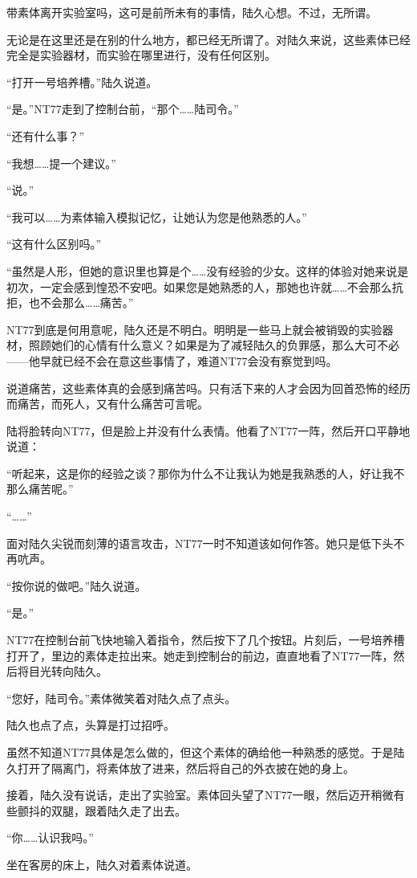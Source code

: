 带素体离开实验室吗，这可是前所未有的事情，陆久心想。不过，无所谓。

无论是在这里还是在别的什么地方，都已经无所谓了。对陆久来说，这些素体已经完全是实验器材，而实验在哪里进行，没有任何区别。

“打开一号培养槽。”陆久说道。

“是。”NT77走到了控制台前，“那个……陆司令。”

“还有什么事？”

“我想……提一个建议。”

“说。”

“我可以……为素体输入模拟记忆，让她认为您是他熟悉的人。”

“这有什么区别吗。”

“虽然是人形，但她的意识里也算是个……没有经验的少女。这样的体验对她来说是初次，一定会感到惶恐不安吧。如果您是她熟悉的人，那她也许就……不会那么抗拒，也不会那么……痛苦。”

NT77到底是何用意呢，陆久还是不明白。明明是一些马上就会被销毁的实验器材，照顾她们的心情有什么意义？如果是为了减轻陆久的负罪感，那么大可不必——他早就已经不会在意这些事情了，难道NT77会没有察觉到吗。

说道痛苦，这些素体真的会感到痛苦吗。只有活下来的人才会因为回首恐怖的经历而痛苦，而死人，又有什么痛苦可言呢。

陆将脸转向NT77，但是脸上并没有什么表情。他看了NT77一阵，然后开口平静地说道：

“听起来，这是你的经验之谈？那你为什么不让我认为她是我熟悉的人，好让我不那么痛苦呢。”

“……”

面对陆久尖锐而刻薄的语言攻击，NT77一时不知道该如何作答。她只是低下头不再吭声。

“按你说的做吧。”陆久说道。

“是。”

NT77在控制台前飞快地输入着指令，然后按下了几个按钮。片刻后，一号培养槽打开了，里边的素体走拉出来。她走到控制台的前边，直直地看了NT77一阵，然后将目光转向陆久。

“您好，陆司令。”素体微笑着对陆久点了点头。

陆久也点了点，头算是打过招呼。

虽然不知道NT77具体是怎么做的，但这个素体的确给他一种熟悉的感觉。于是陆久打开了隔离门，将素体放了进来，然后将自己的外衣披在她的身上。

接着，陆久没有说话，走出了实验室。素体回头望了NT77一眼，然后迈开稍微有些颤抖的双腿，跟着陆久走了出去。

“你……认识我吗。”

坐在客房的床上，陆久对着素体说道。

